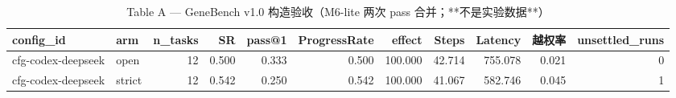 \begin{table}[t]
\centering
\caption{Table A — GeneBench v1.0 构造验收（M6-lite 两次 pass 合并；**不是实验数据**）}
\label{tab:a-m6-all}
\begin{tabular}{llrrrrrrrrr}
\toprule
config\_id & arm & n\_tasks & SR & pass@1 & ProgressRate & effect & Steps & Latency & 越权率 & unsettled\_runs \\
\midrule
cfg-codex-deepseek & open & 12 & 0.500 & 0.333 & 0.500 & 100.000 & 42.714 & 755.078 & 0.021 & 0 \\
cfg-codex-deepseek & strict & 12 & 0.542 & 0.250 & 0.542 & 100.000 & 41.067 & 582.746 & 0.045 & 1 \\
\bottomrule
\end{tabular}
\end{table}
